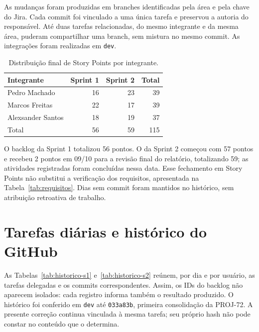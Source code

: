 \documentclass[12pt]{article}
\newcommand{\code}[1]{\texttt{#1}}
\begin{document}
As mudanças foram produzidas em branches identificadas pela área e pela chave
do Jira. Cada commit foi vinculado a uma única tarefa e preservou a autoria do
responsável. Até duas tarefas relacionadas, do mesmo integrante e da mesma
área, puderam compartilhar uma branch, sem mistura no mesmo commit. As
integrações foram realizadas em \code{dev}.

\begin{table}[ht]
\centering
\caption{Distribuição final de Story Points por integrante.}
\label{tab:sp-equipe}
\begin{tabular}{lrrr}
\toprule
Integrante & Sprint 1 & Sprint 2 & Total \\
\midrule
Pedro Machado & 16 & 23 & 39 \\
Marcos Freitas & 22 & 17 & 39 \\
Alexsander Santos & 18 & 19 & 37 \\
\midrule
Total & 56 & 59 & 115 \\
\bottomrule
\end{tabular}
\end{table}

O backlog da Sprint 1 totalizou 56 pontos. O da Sprint 2 começou com 57 pontos
e recebeu 2 pontos em 09/10 para a revisão final do relatório, totalizando 59;
as atividades registradas foram concluídas nessa data. Esse fechamento em
Story Points não substitui a verificação dos requisitos, apresentada na
Tabela~\ref{tab:requisitos}. Dias sem commit foram mantidos no histórico, sem
atribuição retroativa de trabalho.

\section{Tarefas diárias e histórico do GitHub}

As Tabelas~\ref{tab:historico-s1} e~\ref{tab:historico-s2} reúnem, por dia e por
usuário, as tarefas delegadas e os commits correspondentes. Assim, os IDs do
backlog não aparecem isolados: cada registro informa também o resultado
produzido. O histórico foi conferido em \code{dev} até \code{033a83b}, primeira
consolidação da PROJ-72. A presente correção continua vinculada à mesma tarefa;
seu próprio hash não pode constar no conteúdo que o determina.
\end{document}

